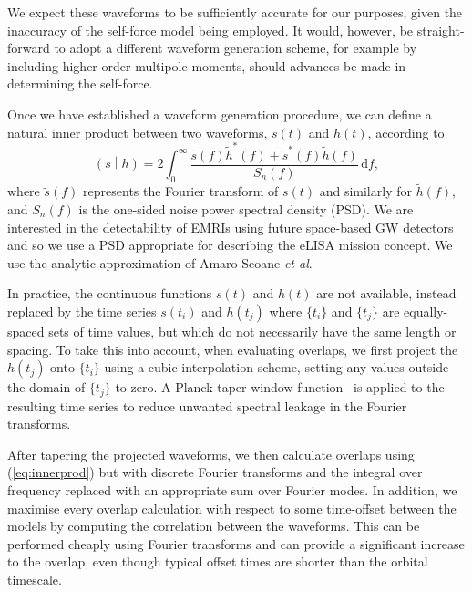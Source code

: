 \documentclass[aps,prd,amsfonts,amssymb,amsmath,nofootinbib,showpacs,superscriptaddress,twocolumn]{revtex4}
\newcommand{\eqnref}[1]{(\ref{eq:#1})}
\newcommand{\dd}{\ensuremath{\mathrm{d}}}
\newcommand{\intd}[4]{\ensuremath{\int_{#1}^{#2}{#3}\,\dd{#4}}}
\newcommand{\overlap}[2]{\ensuremath{\left(#1\middle|#2\right)}}
\begin{document}
We expect these waveforms to be sufficiently accurate for our purposes, given the inaccuracy of the self-force model being employed. It would, however, be straight-forward to adopt a different waveform generation scheme, for example by including higher order multipole moments, should advances be made in determining the self-force.

Once we have established a waveform generation procedure, we can define a natural inner product between two waveforms, $s(t)$ and $h(t)$, according to
\begin{equation}
\label{eq:innerprod}
\overlap{s}{h} = 2 \intd{0}{\infty}{\frac{\tilde{s}(f)\tilde{h}^*(f)+\tilde{s}^*(f)\tilde{h}(f)}{S_n(f)}}{f},
\end{equation}
where $\tilde{s}(f)$ represents the Fourier transform of $s(t)$ and similarly for $\tilde{h}(f)$, and $S_n(f)$ is the one-sided noise power spectral density (PSD). We are interested in the detectability of EMRIs using future space-based GW detectors and so we use a PSD appropriate for describing the eLISA mission concept. We use the analytic approximation of Amaro-Seoane {\it{et al}}.~\cite{Amaro-Seoane2012a}

In practice, the continuous functions $s(t)$ and $h(t)$ are not available, instead replaced by the time series $s(t_i)$ and $h(t_j)$ where $\{t_i\}$ and $\{t_j\}$ are equally-spaced sets of time values, but which do not necessarily have the same length or spacing. To take this into account, when evaluating overlaps, we first project the $h(t_j)$ onto $\{t_i\}$ using a cubic interpolation scheme, setting any values outside the domain of $\{t_j\}$ to zero. A Planck-taper window function~\cite{McKechan2010} is applied to the resulting time series to reduce unwanted spectral leakage in the Fourier transforms.

After tapering the projected waveforms, we then calculate overlaps using \eqnref{innerprod} but with discrete Fourier transforms and the integral over frequency replaced with an appropriate sum over Fourier modes. In addition, we maximise every overlap calculation with respect to some time-offset between the models by computing the correlation between the waveforms. This can be performed cheaply using Fourier transforms and can provide a significant increase to the overlap, even though typical offset times are shorter than the orbital timescale.

\end{document}
